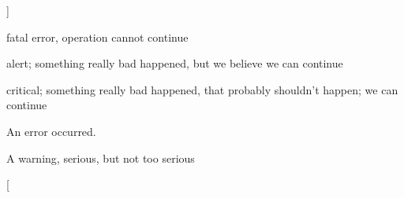 \begin{Desc}
\begin{description}
{}]\item[{\em 
UPK\_\-DIAGLVL\_\-INFO\label{tp_8c_ga69a581dfd708ad2e18688e01cbcc0ff8a2bb69eb89e08c5587c87186e04b0aaa8}
}]\item[{\em 
UPK\_\-DIAGLVL\_\-DEBUG0\label{tp_8c_ga69a581dfd708ad2e18688e01cbcc0ff8af6a6be2812d975c859910213b5361e39}
}]\item[{\em 
UPK\_\-DIAGLVL\_\-DEBUG1\label{tp_8c_ga69a581dfd708ad2e18688e01cbcc0ff8a77aa4e5c1c3416dea8d1e7299aaa1530}
}]\item[{\em 
UPK\_\-DIAGLVL\_\-FATAL\label{tp_8c_ga69a581dfd708ad2e18688e01cbcc0ff8a600f5dbf5250560dfb55d2b960d25b95}
}]fatal error, operation cannot continue \item[{\em 
UPK\_\-DIAGLVL\_\-ALERT\label{tp_8c_ga69a581dfd708ad2e18688e01cbcc0ff8a42b4debd590867bfd13127c7998ca3eb}
}]alert; something really bad happened, but we believe we can continue \item[{\em 
UPK\_\-DIAGLVL\_\-CRIT\label{tp_8c_ga69a581dfd708ad2e18688e01cbcc0ff8a2459215f50532f8bd045d8926b09cbe1}
}]critical; something really bad happened, that probably shouldn't happen; we can continue \item[{\em 
UPK\_\-DIAGLVL\_\-ERROR\label{tp_8c_ga69a581dfd708ad2e18688e01cbcc0ff8a554508c4755c0b5a7254b5032c8220d2}
}]An error occurred. \item[{\em 
UPK\_\-DIAGLVL\_\-WARN\label{tp_8c_ga69a581dfd708ad2e18688e01cbcc0ff8a28fff8a74dfb72e3c0fad13c8fcd6168}
}]A warning, serious, but not too serious \item[{\em 
}
\end{description}
\end{Desc}
